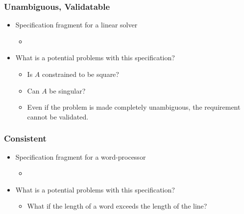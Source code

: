 \documentclass[t,12pt,numbers,fleqn]{beamer}
\begin{document}

\begin{frame}
\frametitle{Unambiguous, Validatable}

\begin{itemize}

\item Specification fragment for a linear solver
\begin{itemize}
\item {}
\end{itemize}
\item What is a potential problems with this specification?
\begin{itemize}
\item<2-> {\alert{Is $A$ constrained to be square?}}
\item<2-> {\alert{Can $A$ be singular?}}
\item<2-> {\alert{Even if the problem is made completely unambiguous, the requirement cannot be validated.}}
\end{itemize}

\end{itemize}

\end{frame}


\begin{frame}
\frametitle{Consistent}

\begin{itemize}

\item Specification fragment for a word-processor
\begin{itemize}
\item {}
\end{itemize}
\item What is a potential problems with this specification?
\begin{itemize}
\item<2-> {\alert{What if the length of a word exceeds the length of the line?}}
\end{itemize}

\end{itemize}

\end{frame}
\end{document}
